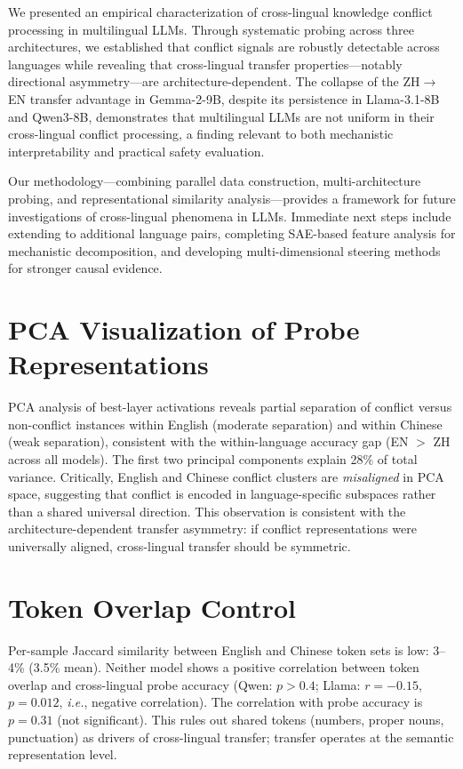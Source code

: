 \documentclass[11pt]{article}
\newcommand{\ie}{\textit{i.e.}}
\begin{document}
We presented an empirical characterization of cross-lingual knowledge conflict processing in multilingual LLMs.
Through systematic probing across three architectures, we established that conflict signals are robustly detectable across languages while revealing that cross-lingual transfer properties---notably directional asymmetry---are architecture-dependent.
The collapse of the ZH$\to$EN transfer advantage in Gemma-2-9B, despite its persistence in Llama-3.1-8B and Qwen3-8B, demonstrates that multilingual LLMs are not uniform in their cross-lingual conflict processing, a finding relevant to both mechanistic interpretability and practical safety evaluation.

Our methodology---combining parallel data construction, multi-architecture probing, and representational similarity analysis---provides a framework for future investigations of cross-lingual phenomena in LLMs.
Immediate next steps include extending to additional language pairs, completing SAE-based feature analysis for mechanistic decomposition, and developing multi-dimensional steering methods for stronger causal evidence.




\appendix

\section{PCA Visualization of Probe Representations}
\label{app:pca}

PCA analysis of best-layer activations reveals partial separation of conflict versus non-conflict instances within English (moderate separation) and within Chinese (weak separation), consistent with the within-language accuracy gap (EN $>$ ZH across all models).
The first two principal components explain 28\% of total variance.
Critically, English and Chinese conflict clusters are \emph{misaligned} in PCA space, suggesting that conflict is encoded in language-specific subspaces rather than a shared universal direction.
This observation is consistent with the architecture-dependent transfer asymmetry: if conflict representations were universally aligned, cross-lingual transfer should be symmetric.

\section{Token Overlap Control}
\label{app:token}

Per-sample Jaccard similarity between English and Chinese token sets is low: 3--4\% (3.5\% mean).
Neither model shows a positive correlation between token overlap and cross-lingual probe accuracy (Qwen: $p > 0.4$; Llama: $r = -0.15$, $p = 0.012$, \ie, negative correlation).
The correlation with probe accuracy is $p = 0.31$ (not significant).
This rules out shared tokens (numbers, proper nouns, punctuation) as drivers of cross-lingual transfer; transfer operates at the semantic representation level.
\end{document}
